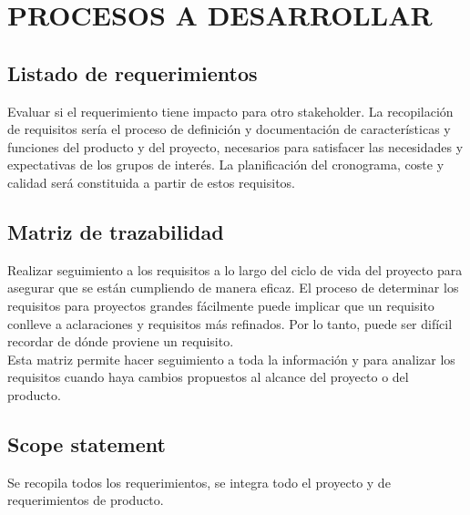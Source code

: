 \chapter{PROCESOS A DESARROLLAR}
%
\section{Listado de requerimientos}
Evaluar si el requerimiento tiene impacto para otro stakeholder. La recopilaci\'on de requisitos ser\'ia el proceso
de definici\'on y documentaci\'on de caracter\'isticas y funciones del producto y del proyecto, necesarios para 
satisfacer las necesidades y expectativas de los grupos de inter\'es. La planificaci\'on del cronograma, coste y
calidad ser\'a constituida a partir de estos requisitos.
%
\section{Matriz de trazabilidad}
Realizar seguimiento a los requisitos a lo largo del ciclo de vida del proyecto para asegurar que se est\'an
cumpliendo de manera eficaz. El proceso de determinar los requisitos para proyectos grandes f\'acilmente puede
implicar que un requisito conlleve a aclaraciones y requisitos m\'as refinados. Por lo tanto, puede ser dif\'icil
recordar de d\'onde proviene un requisito.\\%
Esta matriz permite hacer seguimiento a toda la informaci\'on y para analizar los requisitos cuando haya cambios
propuestos al alcance del proyecto o del producto.
%
\section{Scope statement}
Se recopila todos los requerimientos, se integra todo el proyecto y de requerimientos de producto.